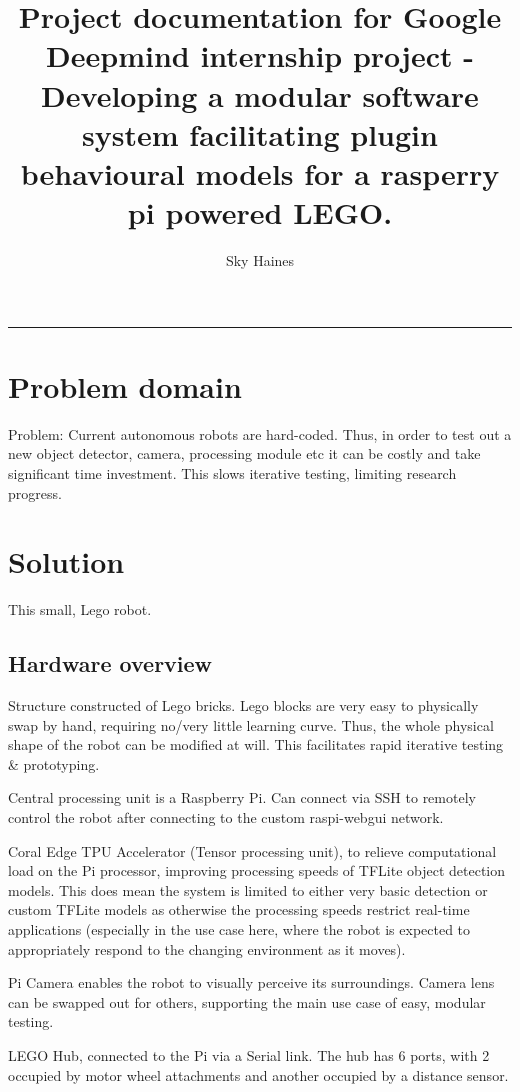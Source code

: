 \documentclass[10pt]{article}
\title{Project documentation for Google Deepmind internship project - Developing a modular software system facilitating plugin behavioural models for a rasperry pi powered LEGO.}
\author{Sky Haines}
\date{}
\newcommand{\divider}{\vskip2pt\hrule\vskip2pt}
\begin{document}
\maketitle

\divider

\section*{Problem domain}

Problem: Current autonomous robots are hard-coded. Thus, in order to test out a new object detector, camera, processing module etc it can be costly and take significant time investment. This slows iterative testing, limiting research progress.

\section*{Solution}

This small, Lego robot.

\subsection*{Hardware overview}

Structure constructed of Lego bricks.
Lego blocks are very easy to physically swap by hand, requiring no/very little learning curve. Thus, the whole physical shape of the robot can be modified at will. This facilitates rapid iterative testing \& prototyping.

Central processing unit is a Raspberry Pi. Can connect via SSH to remotely control the robot after connecting to the custom raspi-webgui network. 

Coral Edge TPU Accelerator (Tensor processing unit), to relieve computational load on the Pi processor, improving processing speeds of TFLite object detection models. This does mean the system is limited to either very basic detection or custom TFLite models as otherwise the processing speeds restrict real-time applications (especially in the use case here, where the robot is expected to appropriately respond to the changing environment as it moves).

Pi Camera enables the robot to visually perceive its surroundings. Camera lens can be swapped out for others, supporting the main use case of easy, modular testing.

LEGO Hub, connected to the Pi via a Serial link. The hub has 6 ports, with 2 occupied by motor wheel attachments and another occupied by a distance sensor.
\end{document}
